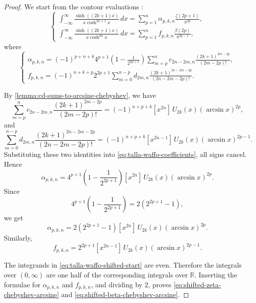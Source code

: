 \documentclass[11pt,twoside]{article}
\numberwithin{equation}{section}
\begin{document}
\begin{proof}
We start from the contour evaluations 
\cite{talla_waffo_integral_2025}:
\begin{equation}\label{eq:talla-waffo-shifted-start}
\begin{cases}
\displaystyle
\int_{-\infty}^{\infty}
\frac{\sinh((2k+1)x)}{x\cosh^{2n+1}x}\,dx
=
\sum_{p=1}^{n}
\alpha_{p,k,n}
\frac{\zeta(2p+1)}{\pi^{2p}},
\\[2.4em]
\displaystyle
\int_{-\infty}^{\infty}
\frac{\sinh((2k+1)x)}{x\cosh^{2n}x}\,dx
=
\sum_{p=1}^{n}
f_{p,k,n}
\frac{\beta(2p)}{\pi^{2p-1}},
\end{cases}
\end{equation}
where
\begin{equation}\label{eq:talla-waffo-coefficients}
\begin{cases}
\displaystyle
\alpha_{p,k,n}
=
(-1)^{p+n+k}4^{p+1}
\left(1-\frac1{2^{2p+1}}\right)
\sum_{m=p}^{n}
c_{2n-2m,n}
\frac{(2k+1)^{2m-2p}}{(2m-2p)!},
\\[2.4em]
\displaystyle
f_{p,k,n}
=
(-1)^{n+k+p}2^{2p+1}
\sum_{m=0}^{n-p}
d_{2m,n}
\frac{(2k+1)^{2n-2m-2p}}
{(2n-2m-2p)!}.
\end{cases}
\end{equation}

By \cref{lemma:cd-sums-to-arcsine-chebyshev}, we have
\[
\sum_{m=p}^{n}
c_{2n-2m,n}
\frac{(2k+1)^{2m-2p}}{(2m-2p)!}
=
(-1)^{n+p+k}
[x^{2n}]\,U_{2k}(x)(\arcsin x)^{2p},
\]
and
\[
\sum_{m=0}^{n-p}
d_{2m,n}
\frac{(2k+1)^{2n-2m-2p}}
{(2n-2m-2p)!}
=
(-1)^{n+p+k}
[x^{2n-1}]\,U_{2k}(x)(\arcsin x)^{2p-1}.
\]
Substituting these two identities into \eqref{eq:talla-waffo-coefficients},
all signs cancel. Hence
\[
\alpha_{p,k,n}
=
4^{p+1}
\left(1-\frac1{2^{2p+1}}\right)
[x^{2n}]\,U_{2k}(x)(\arcsin x)^{2p}.
\]
Since
\[
4^{p+1}
\left(1-\frac1{2^{2p+1}}\right)
=
2(2^{2p+1}-1),
\]
we get
\[
\alpha_{p,k,n}
=
2(2^{2p+1}-1)
[x^{2n}]\,U_{2k}(x)(\arcsin x)^{2p}.
\]
Similarly,
\[
f_{p,k,n}
=
2^{2p+1}
[x^{2n-1}]\,U_{2k}(x)(\arcsin x)^{2p-1}.
\]

The integrands in \eqref{eq:talla-waffo-shifted-start} are even. Therefore
the integrals over \((0,\infty)\) are one half of the corresponding
integrals over \(\mathbb R\). Inserting the formulae for
\(\alpha_{p,k,n}\) and \(f_{p,k,n}\), and dividing by \(2\), proves
\eqref{eq:shifted-zeta-chebyshev-arcsine} and
\eqref{eq:shifted-beta-chebyshev-arcsine}.
\end{proof}
\end{document}
